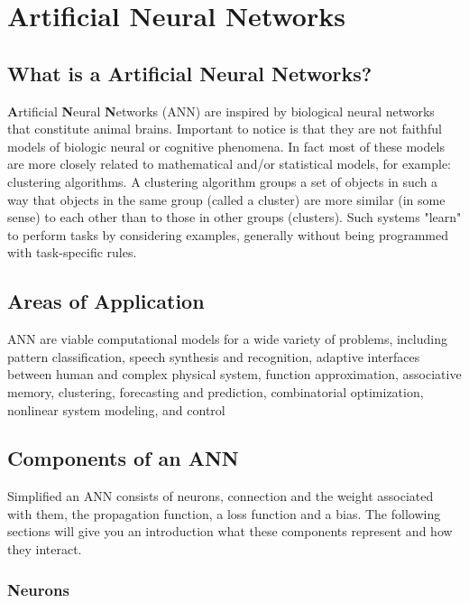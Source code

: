 \chapter{Artificial Neural Networks\authorB} \label{ref:ann}

\section{What is a Artificial Neural Networks?}

  \textbf{A}rtificial \textbf{N}eural \textbf{N}etworks (ANN) are inspired by biological neural networks that constitute animal brains. Important to notice is that they are not faithful models of biologic neural or cognitive phenomena. In fact most of these models are more closely related to mathematical and/or statistical models, for example: clustering algorithms. A clustering algorithm groups a set of objects in such a way that objects in the same group (called a cluster) are more similar (in some sense) to each other than to those in other groups (clusters). Such systems "learn" to perform tasks by considering examples, generally without being programmed with task-specific rules. 
 
\section{Areas of Application}

 ANN are viable computational models for a wide variety of problems, including pattern classification, speech synthesis and recognition, adaptive interfaces between human and complex physical system, function approximation, associative memory, clustering, forecasting and prediction, combinatorial optimization, nonlinear system modeling, and control
 \cite{fundamentals_ann}
 
\section{Components of an ANN}

Simplified an ANN consists of neurons, connection and the weight associated with them, the propagation function, a loss function and a bias. The following sections will give you an introduction what these components represent and how they interact. 

\subsection{Neurons}

